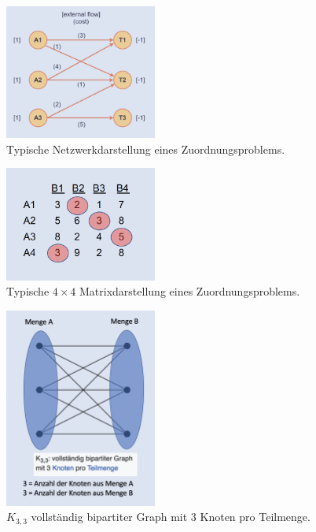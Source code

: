\begin{figure}
\centering
\includegraphics[width=5cm]{papers/munkres/figures/Netzwerkdarstellung}
\caption{Typische Netzwerkdarstellung eines Zuordnungsproblems.}
\label{munkres:netzwerkdarstellung}
\end{figure}

\begin{figure}
\centering
\includegraphics[width=5cm]{papers/munkres/figures/Matrixdarstellung}
\caption{Typische $4\times 4$ Matrixdarstellung eines Zuordnungsproblems.}
\label{munkres:matrixdarstellung}
\end{figure}

\begin{figure}
\centering
\includegraphics[width=5cm]{papers/munkres/figures/bipartiter_graph}
\caption{$K_{3,3}$ vollständig bipartiter Graph mit 3 Knoten pro Teilmenge.}
\label{munkres:bipartit}
\end{figure}
